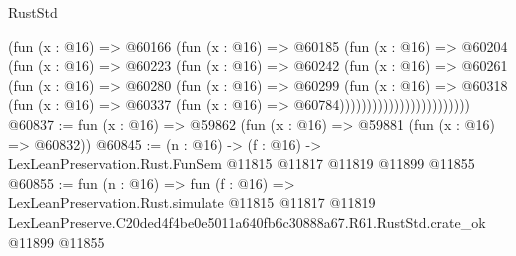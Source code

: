 \begin{lexlean}{RustStd}
\begin{coremodule}
                              (fun (x : @16) =>
                              @60166
                                (fun (x : @16) =>
                                @60185
                                  (fun (x : @16) =>
                                  @60204
                                    (fun (x : @16) =>
                                    @60223
                                      (fun (x : @16) =>
                                      @60242
                                        (fun (x : @16) =>
                                        @60261
                                          (fun (x : @16) =>
                                          @60280
                                            (fun (x : @16) =>
                                            @60299
                                              (fun (x : @16) =>
                                              @60318
                                                (fun (x : @16) =>
                                                @60337
                                                  (fun (x : @16) => @60784))))))))))))))))))))))))
@60837 := fun (x : @16) => @59862 (fun (x : @16) => @59881 (fun (x : @16) => @60832))
@60845 := (n : @16) ->
  (f : @16) -> LexLeanPreservation.Rust.FunSem @11815 @11817 @11819 @11899 @11855
@60855 := fun (n : @16) =>
  fun (f : @16) =>
  LexLeanPreservation.Rust.simulate
    @11815
    @11817
    @11819
    LexLeanPreserve.C20ded4f4be0e5011a640fb6c30888a67.R61.RustStd.crate_ok
    @11899
    @11855
\end{coremodule}
\end{lexlean}
